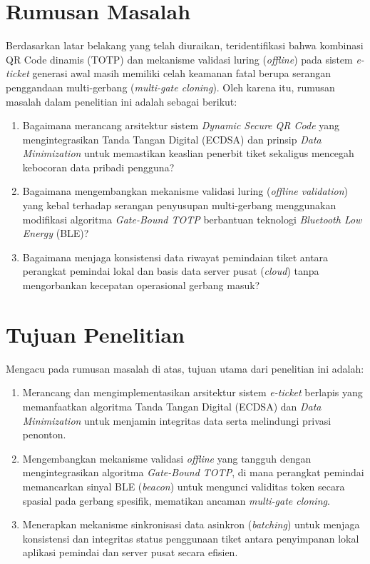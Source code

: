 \section{Rumusan Masalah}
Berdasarkan latar belakang yang telah diuraikan, teridentifikasi bahwa kombinasi QR Code dinamis (TOTP) dan mekanisme validasi luring (\textit{offline}) pada sistem \textit{e-ticket} generasi awal masih memiliki celah keamanan fatal berupa serangan penggandaan multi-gerbang (\textit{multi-gate cloning}). Oleh karena itu, rumusan masalah dalam penelitian ini adalah sebagai berikut:
\begin{enumerate}
    \item Bagaimana merancang arsitektur sistem \textit{Dynamic Secure QR Code} yang mengintegrasikan Tanda Tangan Digital (ECDSA) dan prinsip \textit{Data Minimization} untuk memastikan keaslian penerbit tiket sekaligus mencegah kebocoran data pribadi pengguna?
    \item Bagaimana mengembangkan mekanisme validasi luring (\textit{offline validation}) yang kebal terhadap serangan penyusupan multi-gerbang menggunakan modifikasi algoritma \textit{Gate-Bound TOTP} berbantuan teknologi \textit{Bluetooth Low Energy} (BLE)?
    \item Bagaimana menjaga konsistensi data riwayat pemindaian tiket antara perangkat pemindai lokal dan basis data server pusat (\textit{cloud}) tanpa mengorbankan kecepatan operasional gerbang masuk?
\end{enumerate}

\section{Tujuan Penelitian}
Mengacu pada rumusan masalah di atas, tujuan utama dari penelitian ini adalah:
\begin{enumerate}
    \item Merancang dan mengimplementasikan arsitektur sistem \textit{e-ticket} berlapis yang memanfaatkan algoritma Tanda Tangan Digital (ECDSA) dan \textit{Data Minimization} untuk menjamin integritas data serta melindungi privasi penonton.
    \item Mengembangkan mekanisme validasi \textit{offline} yang tangguh dengan mengintegrasikan algoritma \textit{Gate-Bound TOTP}, di mana perangkat pemindai memancarkan sinyal BLE (\textit{beacon}) untuk mengunci validitas token secara spasial pada gerbang spesifik, mematikan ancaman \textit{multi-gate cloning}.
    \item Menerapkan mekanisme sinkronisasi data asinkron (\textit{batching}) untuk menjaga konsistensi dan integritas status penggunaan tiket antara penyimpanan lokal aplikasi pemindai dan server pusat secara efisien.
\end{enumerate}

